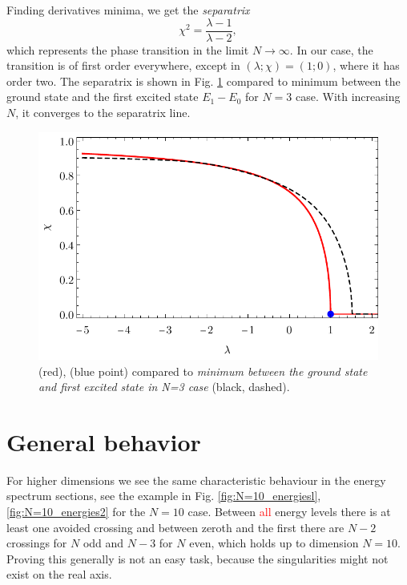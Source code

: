Finding derivatives minima, we get the \emph{separatrix}
\begin{equation}
    \chi^2=\frac{\lambda-1}{\lambda-2},
    \label{eq:separatrix}
\end{equation}
which represents the phase transition in the limit $N\rightarrow \infty$. In our case, the transition is of first order everywhere, except in $(\lambda;\chi)=(1;0)$, where it has order two. The separatrix is shown in Fig. \ref{fig:transitionCompare} compared to minimum between the ground state and the first excited state $E_1-E_0$ for $N=3$ case. With increasing $N$, it converges to the separatrix line.

\begin{figure}[H]
    \centering
    \includegraphics{../img/infiniteN_transitionCompare.pdf}
    \caption{ (red),  (blue point) compared to \emph{minimum between the ground state and first excited state in N=3 case} (black, dashed).}
    \label{fig:transitionCompare}    
\end{figure}












\section{General behavior}
For higher dimensions we see the same characteristic behaviour in the energy spectrum sections, see the example in Fig. \ref{fig:N=10_energiesl}, \ref{fig:N=10_energies2} for the $N=10$ case. Between \textcolor{red}{all} energy levels there is at least one avoided crossing and between zeroth and the first there are $N-2$ crossings for $N$ odd and $N-3$ for $N$ even, which holds up to dimension $N=10$. Proving this generally is not an easy task, because the singularities might not exist on the real axis.


